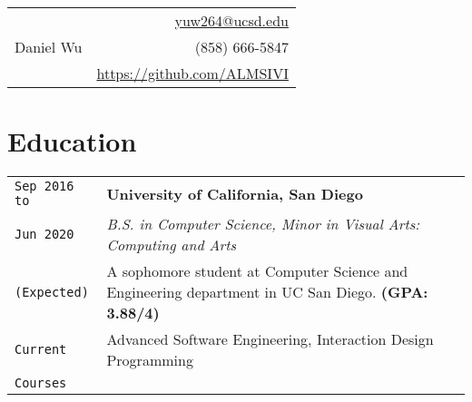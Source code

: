 \documentclass[12pt, letterpaper]{article}
\begin{document}
	\noindent
	\begin{tabularx}{\linewidth}{X r}
		\multirow{3}{*}{{\fontsize{45}{60}\selectfont Daniel Wu}}
		& \href{mailto:yuw264@ucsd.edu}{yuw264@ucsd.edu} \\
		& (858) 666-5847 \\
		& \href{https://github.com/ALMSIVI}{https://github.com/ALMSIVI}
	\end{tabularx}
	
\begin{comment} %
\begin{tabularx}{\linewidth}{X r}
\multirow{4}{*}{{\fontsize{45}{60}\selectfont Yue Wu}} 
& \href{mailto:yuw264@ucsd.edu}{yuw264@ucsd.edu} \\
& (858) 666-5847 \\
& 8840 Costa Verde Blvd. Apt. 3322 \\
& San Diego, CA 92122
\end{tabularx}
\end{comment}

\bigskip

\section{Education}
\smallskip
\noindent
\begin{tabularx}{\linewidth}{l | X}	
\texttt{Sep 2016 to} & \textbf{\large University of California, San Diego} \\
\texttt{Jun 2020} & \textit{B.S. in Computer Science, Minor in Visual Arts: Computing and Arts} \\
\texttt{(Expected)} & A sophomore student at Computer Science and Engineering department in UC San Diego. \textbf{(GPA: 3.88/4)} \\
\texttt{Current} & Advanced Software Engineering, Interaction Design Programming \\
\texttt{Courses}
\end{tabularx}

\bigskip
\end{document}
